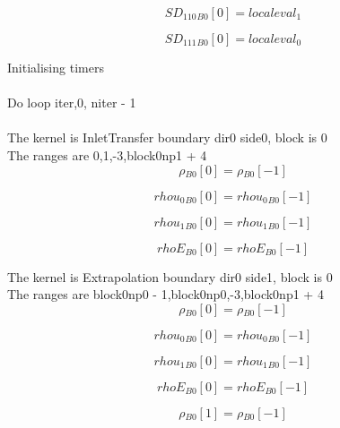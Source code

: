 \documentclass{article}
\begin{document}
\begin{dmath}{SD_{110}{_{B0}}}[{0}] = localeval_{1}\end{dmath}

\begin{dmath}{SD_{111}{_{B0}}}[{0}] = localeval_{0}\end{dmath}

\noindent Initialising timers\\
\\\noindent Do loop iter,0, niter - 1\\
\\\noindent The kernel is InletTransfer boundary dir0 side0, block is 0\\\noindent The ranges are 0,1,-3,block0np1 + 4\\\begin{dmath}{\rho{_{B0}}}[{0}] = {\rho{_{B0}}}[{-1}]\end{dmath}

\begin{dmath}{rhou_{0}{_{B0}}}[{0}] = {rhou_{0}{_{B0}}}[{-1}]\end{dmath}

\begin{dmath}{rhou_{1}{_{B0}}}[{0}] = {rhou_{1}{_{B0}}}[{-1}]\end{dmath}

\begin{dmath}{rhoE{_{B0}}}[{0}] = {rhoE{_{B0}}}[{-1}]\end{dmath}

\noindent The kernel is Extrapolation boundary dir0 side1, block is 0\\\noindent The ranges are block0np0 - 1,block0np0,-3,block0np1 + 4\\\begin{dmath}{\rho{_{B0}}}[{0}] = {\rho{_{B0}}}[{-1}]\end{dmath}

\begin{dmath}{rhou_{0}{_{B0}}}[{0}] = {rhou_{0}{_{B0}}}[{-1}]\end{dmath}

\begin{dmath}{rhou_{1}{_{B0}}}[{0}] = {rhou_{1}{_{B0}}}[{-1}]\end{dmath}

\begin{dmath}{rhoE{_{B0}}}[{0}] = {rhoE{_{B0}}}[{-1}]\end{dmath}

\begin{dmath}{\rho{_{B0}}}[{1}] = {\rho{_{B0}}}[{-1}]\end{dmath}
\end{document}
